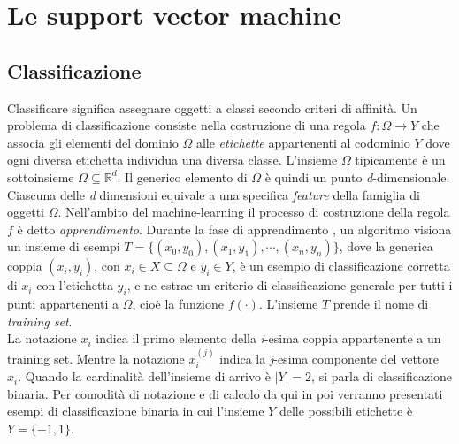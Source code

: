 \documentclass [11pt,a4paper,twoside,openright] {book}
\begin{document}
\chapter{Le support vector machine}
\section{Classificazione}
Classificare significa assegnare oggetti a classi secondo criteri di affinità. Un problema di classificazione consiste nella costruzione di una regola $f: \Omega \rightarrow Y$ che associa gli elementi del dominio $\Omega$ alle \textit{etichette} appartenenti al codominio $Y$ dove ogni diversa etichetta individua una diversa classe. L'insieme $\Omega$ tipicamente è un sottoinsieme $\Omega \subseteq \mathbb{R}^d$. Il generico elemento di $\Omega$ è quindi un punto \textit{d}-dimensionale. Ciascuna delle \textit{d} dimensioni equivale a una specifica \textit{feature} della famiglia di oggetti $\Omega$. Nell'ambito del machine-learning il processo di costruzione della regola $f$ è detto \textit{apprendimento}. Durante la fase di apprendimento , un algoritmo visiona un insieme di esempi $T=\lbrace (x_0,y_0), (x_1,y_1), \cdots, (x_n,y_n) \rbrace$, dove la generica coppia $(x_i,y_i)$, con $x_i \in X \subseteq \Omega$ e $y_i \in Y$, è un esempio di classificazione corretta di $x_i$ con l'etichetta $y_i$, e ne estrae un criterio di classificazione generale per tutti i punti appartenenti a $\Omega$, cioè la funzione $f(\cdot)$. L'insieme $T$ prende il nome di \textit{training set}.\\
La notazione $x_i$ indica il primo elemento della \textit{i}-esima coppia appartenente a un training set. Mentre la notazione $x_{i}^{(j)}$ indica la \textit{j}-esima componente del vettore $x_i$. Quando la cardinalità dell'insieme di arrivo è $|Y|=2$, si parla di classificazione binaria. Per comodità di notazione e di calcolo da qui in poi verranno presentati esempi di classificazione binaria in cui l'insieme $Y$ delle possibili etichette è $Y=\lbrace-1,1\rbrace$.
\end{document}
